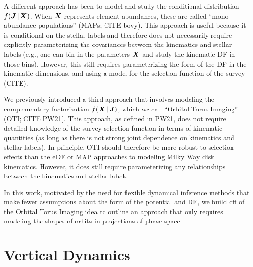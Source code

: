 A different approach has been to model and study the conditional distribution $f(\boldsymbol{J}
\,|\, \boldsymbol{X})$.
When $\boldsymbol{X}$ represents element abundances, these are called ``mono-abundance
populations'' (MAPs; CITE bovy).
This approach is useful because it is conditional on the stellar labels and therefore
does not necessarily require explicitly parameterizing the covariances between the
kinematics and stellar labels (e.g., one can bin in the parameters $\boldsymbol{X}$ and study
the kinematic DF in those bins).
However, this still requires parameterizing the form of the DF in the kinematic
dimensions, and using a model for the selection function of the survey (CITE).

We previously introduced a third approach that involves modeling the complementary
factorization $f(\boldsymbol{X} \,|\, \boldsymbol{J})$, which we call ``Orbital Torus Imaging'' (OTI;
CITE PW21).
This approach, as defined in PW21, does not require detailed knowledge of the survey
selection function in terms of kinematic quantities (as long as there is not strong
joint dependence on kinematics and stellar labels).
In principle, OTI should therefore be more robust to selection effects than the eDF or
MAP approaches to modeling Milky Way disk kinematics.
However, it does still require parameterizing any relationships between the kinematics
and stellar labels.

In this work, motivated by the need for flexible dynamical inference methods that make
fewer assumptions about the form of the potential and DF, we build off of the Orbital
Torus Imaging idea to outline an approach that only requires modeling the shapes of
orbits in projections of phase-space.





\section{Vertical Dynamics} \label{sec:vertical}


